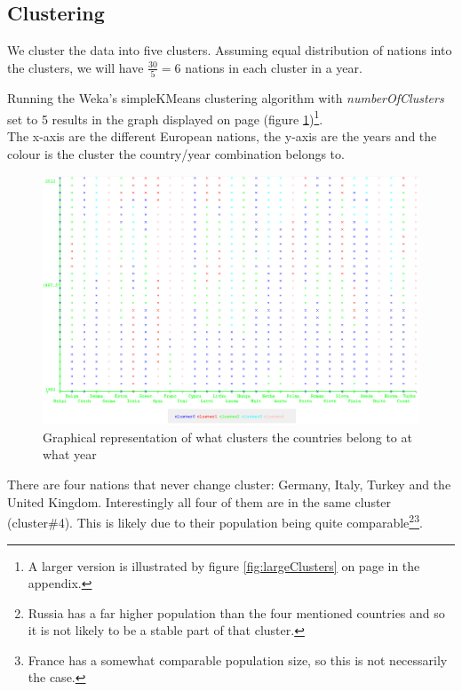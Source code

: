 \subsection{Clustering}
\label{Res_Clu}
We cluster the data into five clusters. Assuming equal distribution of nations into the clusters, we will have \begin{math}\frac{30}{5} = 6\end{math} nations in each cluster in a year.

Running the Weka's simpleKMeans clustering algorithm with \textit{numberOfClusters} set to 5 results in the graph displayed on page \pageref{fig:clusters} (figure \ref{fig:clusters})\footnote{A larger version is illustrated by figure \ref{fig:largeClusters} on page \pageref{fig:largeClusters} in the appendix.}.
\\The x-axis are the different European nations, the y-axis are the years and the colour is the cluster the country/year combination belongs to.

\begin{figure}[h!]
  \centering
\includegraphics[width=\textwidth]{Appendix/Images/kMeans}
\caption{Graphical representation of what clusters the countries belong to at what year}
\label{fig:clusters}
\end{figure}

There are four nations that never change cluster: Germany, Italy, Turkey and the United Kingdom. Interestingly all four of them are in the same cluster (cluster\#4). This is likely due to their population being quite comparable\footnote{Russia has a far higher population than the four mentioned countries and so it is not likely to be a stable part of that cluster.}\footnote{France has a somewhat comparable population size, so this is not necessarily the case.}.

